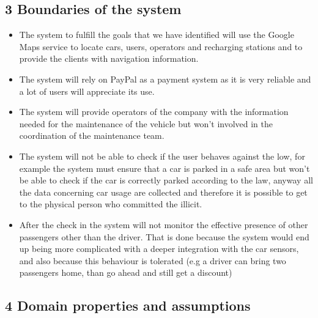 \documentclass[]{article}
\providecommand{\tightlist}{%
  \setlength{\itemsep}{0pt}\setlength{\parskip}{0pt}}
\begin{document}
\subsection{3 Boundaries of the system}\label{boundaries-of-the-system}

\begin{itemize}
\tightlist
\item
  The system to fulfill the goals that we have identified will use the
  Google Maps service to locate cars, users, operators and recharging
  stations and to provide the clients with navigation information.
\item
  The system will rely on PayPal as a payment system as it is very
  reliable and a lot of users will appreciate its use.
\item
  The system will provide operators of the company with the information
  needed for the maintenance of the vehicle but won't involved in the
  coordination of the maintenance team.
\item
  The system will not be able to check if the user behaves against the
  low, for example the system must ensure that a car is parked in a safe
  area but won't be able to check if the car is correctly parked
  according to the law, anyway all the data concerning car usage are
  collected and therefore it is possible to get to the physical person
  who committed the illicit.
\item
  After the check in the system will not monitor the effective presence
  of other passengers other than the driver. That is done because the
  system would end up being more complicated with a deeper integration
  with the car sensors, and also because this behaviour is tolerated
  (e.g a driver can bring two passengers home, than go ahead and still
  get a discount)
\end{itemize}

\subsection{4 Domain properties and
assumptions}\label{domain-properties-and-assumptions}
\end{document}

